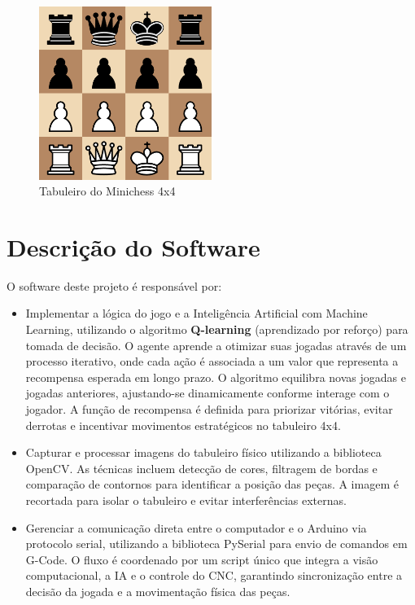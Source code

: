 \documentclass[a4paper,12pt]{article}
\begin{document}
\begin{figure}[H]  
    \centering  
    \includegraphics[width=0.5\textwidth]{images/minichess4x4.png}   
    \caption{Tabuleiro do Minichess 4x4}  
    \label{fig:modelo_cnc}  
\end{figure}  

\vspace{1em}  

\section{Descrição do Software}  
O software deste projeto é responsável por:  
\begin{itemize}  
    \item Implementar a lógica do jogo e a Inteligência Artificial com Machine Learning, utilizando o algoritmo \textbf{Q-learning} (aprendizado por reforço) para tomada de decisão. O agente aprende a otimizar suas jogadas através de um processo iterativo, onde cada ação é associada a um valor que representa a recompensa esperada em longo prazo. O algoritmo equilibra novas jogadas e jogadas anteriores, ajustando-se dinamicamente conforme interage com o jogador. A função de recompensa é definida para priorizar vitórias, evitar derrotas e incentivar movimentos estratégicos no tabuleiro 4x4.  

    \item Capturar e processar imagens do tabuleiro físico utilizando a biblioteca OpenCV. As técnicas incluem detecção de cores, filtragem de bordas e comparação de contornos para identificar a posição das peças. A imagem é recortada para isolar o tabuleiro e evitar interferências externas.  

    \item Gerenciar a comunicação direta entre o computador e o Arduino via protocolo serial, utilizando a biblioteca PySerial para envio de comandos em G-Code. O fluxo é coordenado por um script único que integra a visão computacional, a IA e o controle do CNC, garantindo sincronização entre a decisão da jogada e a movimentação física das peças.  
\end{itemize}  
\end{document}
